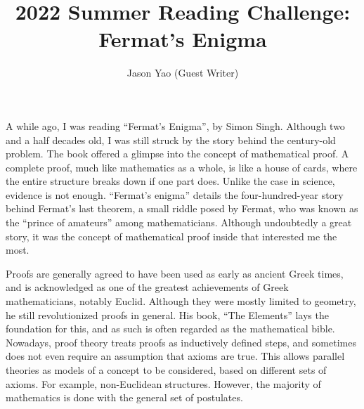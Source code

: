 \documentclass{article}
\title{2022 Summer Reading Challenge: Fermat’s Enigma}
\author{Jason Yao (Guest Writer)}
\begin{document}
A while ago, I was reading ``Fermat’s Enigma'', by Simon Singh. Although two and a half decades old, I was still struck by the story behind the century-old problem. The book offered a glimpse into the concept of mathematical proof. A complete proof, much like mathematics as a whole, is like a house of cards, where the entire structure breaks down if one part does. Unlike the case in science, evidence is not enough. “Fermat’s enigma” details the four-hundred-year story behind Fermat’s last theorem, a small riddle posed by Fermat, who was known as the “prince of amateurs” among mathematicians. Although undoubtedly a great story, it was the concept of mathematical proof inside that interested me the most.

Proofs are generally agreed to have been used as early as ancient Greek times, and is acknowledged as one of the greatest achievements of Greek mathematicians, notably Euclid. Although they were mostly limited to geometry, he still revolutionized proofs in general. His book, “The Elements” lays the foundation for this, and as such is often regarded as the mathematical bible. Nowadays, proof theory treats proofs as inductively defined steps, and sometimes does not even require an assumption that axioms are true. This allows parallel theories as models of a concept to be considered, based on different sets of axioms. For example, non-Euclidean structures. However, the majority of mathematics is done with the general set of postulates.
\end{document}
